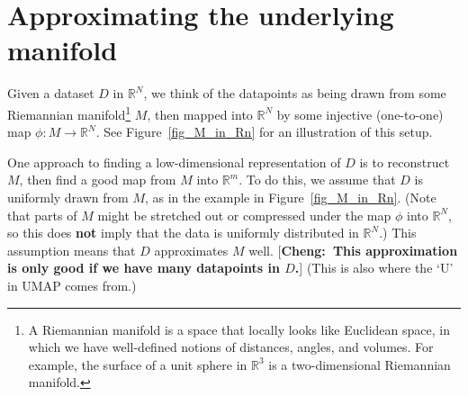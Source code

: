 \documentclass[a4paper,11pt,leqno]{article} \usepackage{amsmath}
\newcommand{\RR}{\mathbb{R}} \newcommand{\QQ}{\mathbb{Q}}
\theoremstyle{definition}
\newcommand{\cheng}[1]{ {\color{purple}[{\bf Cheng:~{#1}}]} }
\begin{document}
\section{Approximating the underlying manifold}
\label{section_uniform}

Given a dataset $D$ in $\RR^N$, we think of the datapoints as being drawn from
some Riemannian manifold\footnote{
  A Riemannian manifold is a space that locally looks like Euclidean space, in
  which we have well-defined notions of distances, angles, and volumes.
  For example, the surface of a unit sphere in $\RR^3$ is a two-dimensional
  Riemannian manifold.
} $M$, then mapped into $\RR^N$ by some injective (one-to-one) map $\phi: M\to\RR^N$.
See Figure~\ref{fig_M_in_Rn} for an illustration of this setup.

One approach to finding a low-dimensional representation of $D$ is to
reconstruct $M$, then find a good map from $M$ into $\RR^m$.
To do this, we assume that $D$ is uniformly drawn from $M$, as in
the example in Figure~\ref{fig_M_in_Rn}.
(Note that parts of $M$ might be stretched out or compressed under the map
$\phi$ into $\RR^N$, so this does {\textbf{not}} imply that the data is
uniformly distributed in $\RR^N$.)
This assumption means that $D$ approximates $M$ well.
\cheng{This approximation is only good if we have many datapoints in $D$.}
(This is also where the `U' in UMAP comes from.)
\end{document}
